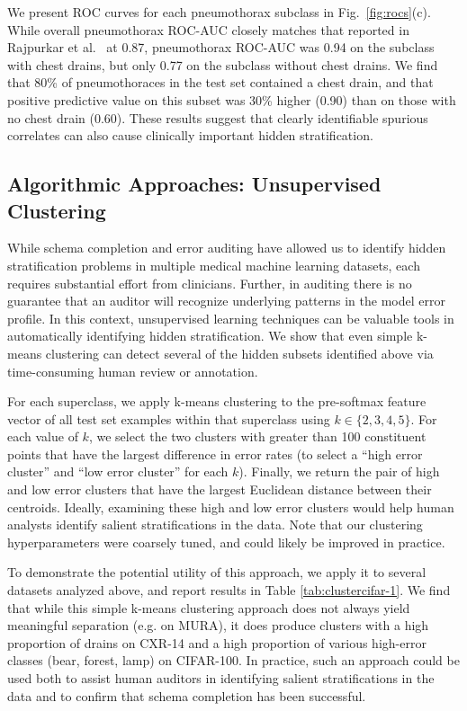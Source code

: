 \documentclass[sigconf,anonymous,review]{acmart}
\begin{document}
We present ROC curves for each pneumothorax subclass in Fig.~\ref{fig:rocs}(c).  
While overall pneumothorax ROC-AUC closely matches that reported in Rajpurkar et al.~\citep{rajpurkar2017chexnet} at 0.87, pneumothorax ROC-AUC was 0.94 on the subclass with chest drains, but only 0.77 on the subclass without chest drains.  
We find that 80\% of pneumothoraces in the test set contained a chest drain, and that positive predictive value on this subset was 30\% higher (0.90) than on those with no chest drain (0.60).  
These results suggest that clearly identifiable spurious correlates can also cause clinically important hidden stratification.

\subsection{Algorithmic Approaches: Unsupervised Clustering}

While schema completion and error auditing have allowed us to identify hidden stratification problems in multiple medical machine learning datasets, each requires substantial effort from clinicians.
Further, in auditing there is no guarantee that an auditor will recognize underlying patterns in the model error profile.
In this context, unsupervised learning techniques can be valuable tools in automatically identifying hidden stratification.
We show that even simple k-means clustering can detect several of the hidden subsets identified above via time-consuming human review or annotation.

For each superclass, we apply k-means clustering to the pre-softmax feature vector of all test set examples within that superclass using $k \in \{2,3,4,5\}$.
For each value of $k$, we select the two clusters with greater than 100 constituent points that have the largest difference in error rates (to select a ``high error cluster'' and ``low error cluster'' for each $k$).
Finally, we return the pair of high and low error clusters that have the largest Euclidean distance between their centroids.
Ideally, examining these high and low error clusters would help human analysts identify salient stratifications in the data.
Note that our clustering hyperparameters were coarsely tuned, and could likely be improved in practice.

To demonstrate the potential utility of this approach, we apply it to several datasets analyzed above, and report results in Table \ref{tab:clustercifar-1}.  
We find that while this simple k-means clustering approach does not always yield meaningful separation (e.g. on MURA), it does produce clusters with a high proportion of drains on CXR-14 and a high proportion of various high-error classes (bear, forest, lamp) on CIFAR-100.  
 In practice, such an approach could be used both to assist human auditors in identifying salient stratifications in the data and to confirm that schema completion has been successful.
\end{document}
